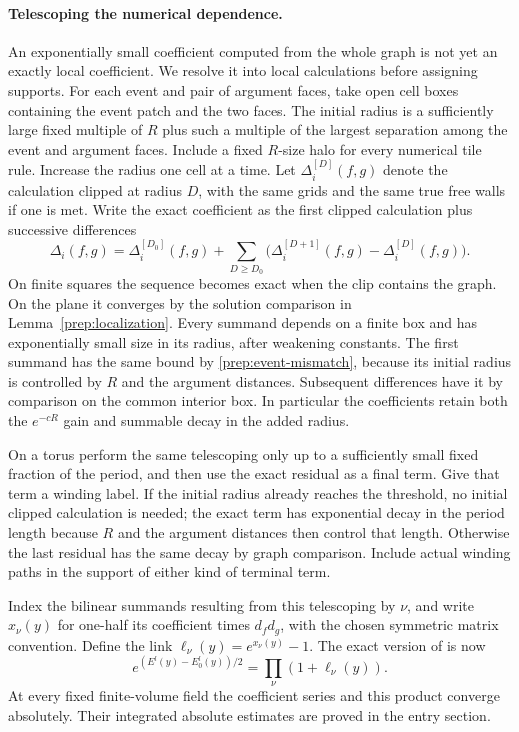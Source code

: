 \paragraph{Telescoping the numerical dependence.}
\label{prep:links}
An exponentially small coefficient computed from the whole graph is
not yet an exactly local coefficient.  We resolve it into local
calculations before assigning supports.  For each event and pair of
argument faces, take open cell boxes containing the event patch and the
two faces.  The initial radius is a sufficiently large fixed multiple
of $R$ plus such a multiple of the largest separation among the event
and argument faces.  Include a fixed $R$-size halo for every numerical
tile rule.  Increase the radius one cell at a time.  Let
$\Delta_i^{[D]}(f,g)$ denote the calculation clipped at radius $D$,
with the same grids and the same true free walls if one is met.  Write
the exact coefficient as the first clipped calculation plus successive
differences
\begin{equation}\label{prep:coefficient-telescope}
 \Delta_i(f,g)=\Delta_i^{[D_0]}(f,g)
     +\sum_{D\ge D_0}\bigl(\Delta_i^{[D+1]}(f,g)
                                  -\Delta_i^{[D]}(f,g)\bigr).
\end{equation}
On finite squares the sequence becomes exact when the clip contains the
graph.  On the plane it converges by the solution comparison in
Lemma~\ref{prep:localization}.  Every summand depends on a finite box and
has exponentially small size in its radius, after weakening constants.
The first summand has the same bound by
\eqref{prep:event-mismatch}, because its initial radius is controlled by
$R$ and the argument distances.  Subsequent differences have it by
comparison on the common interior box.  In particular the coefficients
retain both the $e^{-cR}$ gain and summable decay in the added radius.

On a torus perform the same telescoping only up to a sufficiently small
fixed fraction of the period, and then use the exact residual as a final
term.  Give that term a winding label.  If the initial radius already
reaches the threshold, no initial clipped calculation is needed; the
exact term has exponential decay in the period length because $R$ and
the argument distances then control that length.  Otherwise the last
residual has the same decay by graph comparison.  Include actual winding
paths in the support of either kind of terminal term.

Index the bilinear summands resulting from this telescoping by $\nu$,
and write $x_\nu(y)$ for one-half its coefficient times $d_fd_g$, with
the chosen symmetric matrix convention.  Define the link
$\ell_\nu(y)=e^{x_\nu(y)}-1$.  The exact version of
\cite[Equation (9.10)]{B} is now
\begin{equation}\label{prep:link-product}
          e^{(E^l(y)-E_0^l(y))/2}
                           =\prod_\nu(1+\ell_\nu(y)).
\end{equation}
At every fixed finite-volume field the coefficient series and this
product converge absolutely.  Their integrated absolute estimates are
proved in the entry section.

